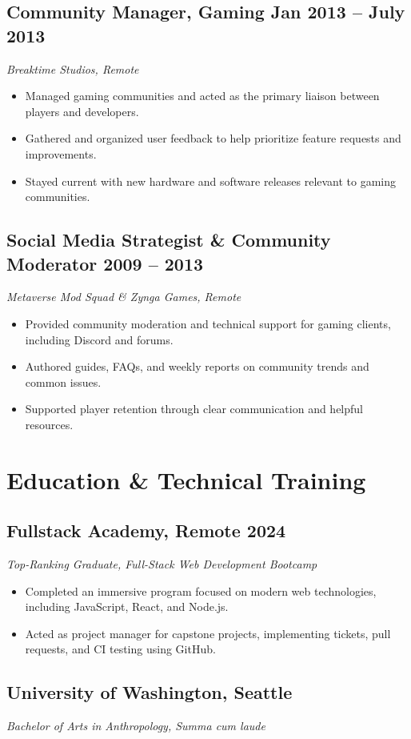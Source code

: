 \documentclass[a4paper,12pt]{article} %
\begin{document}
\subsection{Community Manager, Gaming \hfill Jan 2013 – July 2013}
\textit{Breaktime Studios, Remote}
\begin{itemize}
    \item Managed gaming communities and acted as the primary liaison between players and developers.
    \item Gathered and organized user feedback to help prioritize feature requests and improvements.
    \item Stayed current with new hardware and software releases relevant to gaming communities.
\end{itemize}

\subsection{Social Media Strategist \& Community Moderator \hfill 2009 – 2013}
\textit{Metaverse Mod Squad \& Zynga Games, Remote}
\begin{itemize}
    \item Provided community moderation and technical support for gaming clients, including Discord and forums.
    \item Authored guides, FAQs, and weekly reports on community trends and common issues.
    \item Supported player retention through clear communication and helpful resources.
\end{itemize}

\section{Education \& Technical Training}
\subsection{Fullstack Academy, Remote \hfill 2024}
\textit{Top-Ranking Graduate, Full-Stack Web Development Bootcamp}
\begin{itemize}
    \item Completed an immersive program focused on modern web technologies, including JavaScript, React, and Node.js.
    \item Acted as project manager for capstone projects, implementing tickets, pull requests, and CI testing using GitHub.
\end{itemize}

\subsection{University of Washington, Seattle \hfill}
\textit{Bachelor of Arts in Anthropology, Summa cum laude}
\end{document}
